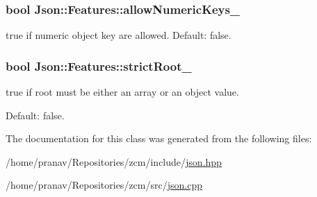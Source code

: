 \subsubsection[{\texorpdfstring{allow\+Numeric\+Keys\+\_\+}{allowNumericKeys_}}]{\setlength{\rightskip}{0pt plus 5cm}bool Json\+::\+Features\+::allow\+Numeric\+Keys\+\_\+}\hypertarget{classJson_1_1Features_aff3cb16b79d15d3d761b11a0dd6d4d6b}{}\label{classJson_1_1Features_aff3cb16b79d15d3d761b11a0dd6d4d6b}


{\ttfamily true} if numeric object key are allowed. Default\+: {\ttfamily false}. 

\subsubsection[{\texorpdfstring{strict\+Root\+\_\+}{strictRoot_}}]{\setlength{\rightskip}{0pt plus 5cm}bool Json\+::\+Features\+::strict\+Root\+\_\+}\hypertarget{classJson_1_1Features_a1162c37a1458adc32582b585b552f9c3}{}\label{classJson_1_1Features_a1162c37a1458adc32582b585b552f9c3}


{\ttfamily true} if root must be either an array or an object value. 

Default\+: {\ttfamily false}. 

The documentation for this class was generated from the following files\+:\begin{DoxyCompactItemize}
\item 
/home/pranav/\+Repositories/zcm/include/\hyperlink{json_8hpp}{json.\+hpp}\item 
/home/pranav/\+Repositories/zcm/src/\hyperlink{json_8cpp}{json.\+cpp}\end{DoxyCompactItemize}
